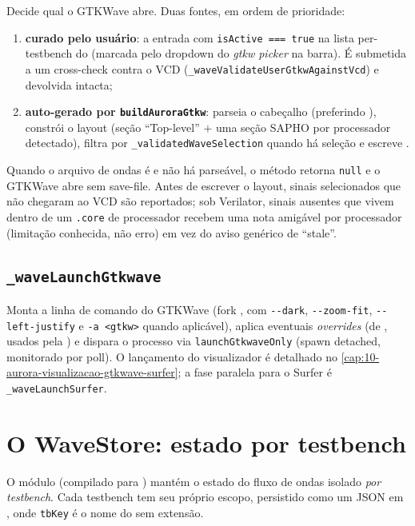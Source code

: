 Decide qual  o GTKWave abre. Duas fontes, em ordem de prioridade:

\begin{enumerate}[leftmargin=*]
  \item \textbf{ curado pelo usuário}: a entrada com
    \lstinline|isActive === true| na lista per-testbench do 
    (marcada pelo dropdown do \emph{gtkw picker} na barra). É submetida a um
    cross-check contra o VCD (\lstinline|_waveValidateUserGtkwAgainstVcd|) e
    devolvida intacta;
  \item \textbf{auto-gerado por \lstinline|buildAuroraGtkw|}: parseia o
    cabeçalho (preferindo ), constrói o layout
    (seção \enquote{Top-level} $+$ uma seção SAPHO por processador detectado),
    filtra por \lstinline|_validatedWaveSelection| quando há seleção e escreve
    .
\end{enumerate}

Quando o arquivo de ondas é  e não há 
parseável, o método retorna \lstinline|null| e o GTKWave abre sem save-file.
Antes de escrever o layout, sinais selecionados que não chegaram ao VCD são
reportados; sob Verilator, sinais ausentes que vivem dentro de um
\lstinline|.core| de processador recebem uma nota amigável por processador
(limitação conhecida, não erro) em vez do aviso genérico de \enquote{stale}.

\subsection{\texttt{\_waveLaunchGtkwave}}

Monta a linha de comando do GTKWave (fork , com \lstinline|--dark|,
\lstinline|--zoom-fit|, \lstinline|--left-justify| e \lstinline|-a <gtkw>| quando
aplicável), aplica eventuais \emph{overrides} (de
, usados pela )
e dispara o processo via \lstinline|launchGtkwaveOnly| (spawn detached,
monitorado por poll). O lançamento do visualizador é detalhado no
\autoref{cap:10-aurora-visualizacao-gtkwave-surfer}; a fase paralela para o Surfer é
\lstinline|_waveLaunchSurfer|.

\section{O WaveStore: estado por testbench}

O módulo  (compilado para
) mantém o estado do fluxo de ondas isolado
\emph{por testbench}. Cada testbench tem seu próprio escopo, persistido como um
JSON em , onde \lstinline|tbKey| é o nome
do  sem extensão.

